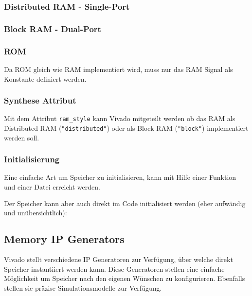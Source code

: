 \subsubsection{Distributed RAM - Single-Port}


\subsubsection{Block RAM - Dual-Port}


\subsubsection{ROM}
Da ROM gleich wie RAM implementiert wird, muss nur das RAM Signal als Konstante definiert werden.


\subsubsection{Synthese Attribut}
Mit dem Attribut \texttt{ram\_style} kann Vivado mitgeteilt werden ob das RAM als Distributed RAM (\texttt{"distributed"}) oder als Block RAM (\texttt{"block"}) implementiert werden soll.


\subsubsection{Initialisierung}
Eine einfache Art um Speicher zu initialisieren, kann mit Hilfe einer Funktion und einer Datei erreicht werden.


Der Speicher kann aber auch direkt im Code initialisiert werden (eher aufwändig und unübersichtlich):


\subsection{Memory IP Generators}
Vivado stellt verschiedene IP Generatoren zur Verfügung, über welche direkt Speicher instantiiert werden kann. Diese Generatoren stellen eine einfache Möglichkeit um Speicher nach den eigenen Wünschen zu konfigurieren. Ebenfalls stellen sie präzise Simulationsmodelle zur Verfügung.
